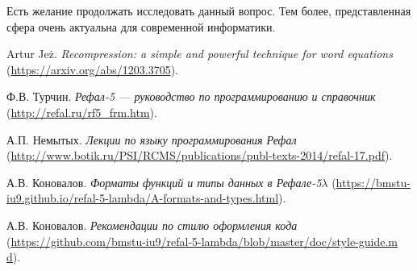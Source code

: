 \documentclass[12pt]{article}
\begin{document}
Есть желание продолжать исследовать данный вопрос. Тем более, представленная
сфера очень актуальна для современной информатики.


\begin{thebibliography}{9}
Artur Jeż. \emph{Recompression: a simple and powerful technique for word
equations} (\url{https://arxiv.org/abs/1203.3705}).

Ф.В. Турчин. \emph{Рефал-5 --- руководство по программированию и справочник}
(\url{http://refal.ru/rf5_frm.htm}).

А.П. Немытых. \emph{Лекции по языку программирования Рефал}
(\url{http://www.botik.ru/PSI/RCMS/publications/publ-texts-2014/refal-17.pdf}).

А.В. Коновалов. \emph{Форматы функций и типы данных в Рефале-5$\lambda$}
(\url{https://bmstu-iu9.github.io/refal-5-lambda/A-formats-and-types.html}).
  
А.В. Коновалов. \emph{Рекомендации по стилю оформления кода}
(\url{https://github.com/bmstu-iu9/refal-5-lambda/blob/master/doc/style-guide.m
d}).
  
\end{thebibliography}
\end{document}
